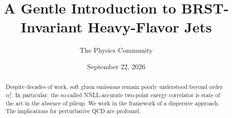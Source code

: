 \documentclass[11pt]{article}
\title{A Gentle Introduction to BRST-Invariant Heavy-Flavor Jets}
\author{The Physics Community}
\date{September 22, 2026}
\numberwithin{equation}{section}
\theoremstyle{definition}
\theoremstyle{remark}
\begin{document}
\maketitle
\begin{abstract}
Despite decades of work, soft gluon emissions remain poorly understood
beyond order $\alpha_s^2$. In particular, the so-called NNLL-accurate
two-point energy correlator is state of the art in the absence of
pileup. We work in the framework of a dispersive approach. The
implications for perturbative QCD are profound.
\end{abstract}
\tableofcontents






\nocite{*}


\end{document}
